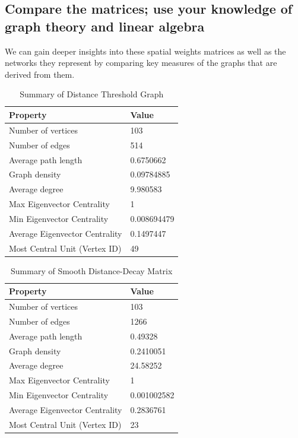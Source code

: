 \documentclass[
  a4paper,
]{article}
\begin{document}
\hypertarget{compare-the-matrices-use-your-knowledge-of-graph-theory-and-linear-algebra}{%
\subsection{Compare the matrices; use your knowledge of graph theory and
linear
algebra}\label{compare-the-matrices-use-your-knowledge-of-graph-theory-and-linear-algebra}}

We can gain deeper insights into these spatial weights matrices as well
as the networks they represent by comparing key measures of the graphs
that are derived from them.

\begin{table}

\caption{\label{tab:unnamed-chunk-7}Summary of Distance Threshold Graph}
\centering
\begin{tabular}[t]{l|l}
\hline
Property & Value\\
\hline
Number of vertices & 103\\
\hline
Number of edges & 514\\
\hline
Average path length & 0.6750662\\
\hline
Graph density & 0.09784885\\
\hline
Average degree & 9.980583\\
\hline
Max Eigenvector Centrality & 1\\
\hline
Min Eigenvector Centrality & 0.008694479\\
\hline
Average Eigenvector Centrality & 0.1497447\\
\hline
Most Central Unit (Vertex ID) & 49\\
\hline
\end{tabular}
\end{table}

\begin{table}

\caption{\label{tab:unnamed-chunk-7}Summary of Smooth Distance-Decay Matrix}
\centering
\begin{tabular}[t]{l|l}
\hline
Property & Value\\
\hline
Number of vertices & 103\\
\hline
Number of edges & 1266\\
\hline
Average path length & 0.49328\\
\hline
Graph density & 0.2410051\\
\hline
Average degree & 24.58252\\
\hline
Max Eigenvector Centrality & 1\\
\hline
Min Eigenvector Centrality & 0.001002582\\
\hline
Average Eigenvector Centrality & 0.2836761\\
\hline
Most Central Unit (Vertex ID) & 23\\
\hline
\end{tabular}
\end{table}
\end{document}
